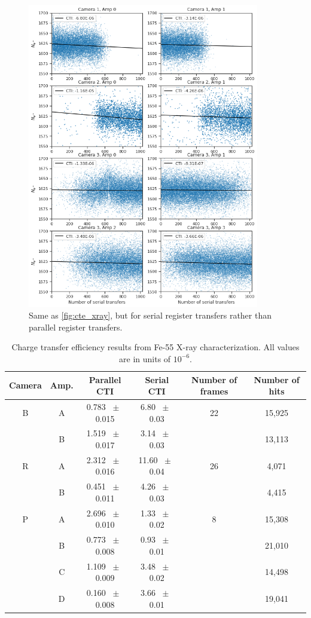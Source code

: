 \begin{figure}
    \centering
    \includegraphics[width=0.9\textwidth]{figures/cte/xray_cte_serial.png}
    \caption{Same as \ref{fig:cte_xray}, but for serial register transfers rather than parallel register transfers.}
    \label{fig:cte_xray_serial}
\end{figure}

\begin{table}
    \centering
    \begin{tabular}{|c|c|c|c|c|c|}\hline
        Camera & Amp. & Parallel CTI & Serial CTI & Number of frames & Number of hits \\\hline
        B & A &0.783 $\;\pm\;$ 0.015 & 6.80 $\;\pm\;$ 0.03 & 22 & 15,925 \\
          & B &1.519 $\;\pm\;$ 0.017 & 3.14 $\;\pm\;$ 0.03 &    & 13,113 \\\hline
        R & A &2.312 $\;\pm\;$ 0.016 & 11.60 $\;\pm\;$ 0.04 & 26 & 4,071 \\
          & B &0.451 $\;\pm\;$ 0.011 & 4.26 $\;\pm\;$ 0.03 &    & 4,415 \\\hline
        P & A &2.696 $\;\pm\;$ 0.010 & 1.33 $\;\pm\;$ 0.02 & 8 & 15,308 \\
          & B &0.773 $\;\pm\;$ 0.008 & 0.93 $\;\pm\;$ 0.01 &   & 21,010 \\
          & C &1.109 $\;\pm\;$ 0.009 & 3.48 $\;\pm\;$ 0.02 &   & 14,498 \\
          & D &0.160 $\;\pm\;$ 0.008 & 3.66 $\;\pm\;$ 0.01 &   & 19,041 \\\hline
    \end{tabular}
    \caption{Charge transfer efficiency results from Fe-55 X-ray characterization. All values are in units of $10^{-6}$.}
    \label{tab:cte_xray}
\end{table}

